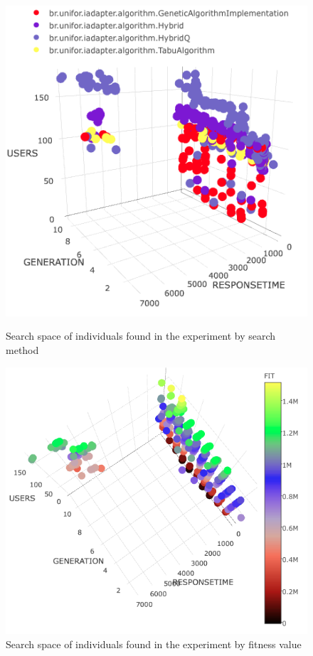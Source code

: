 \begin{figure}[h]
\begin{minipage}{.5\textwidth}
\centering
\includegraphics[width=1\textwidth]{./images/SearchSurface.png}
\caption{Search space of individuals found in the experiment by search method}
\label{fig:surface}
\end{minipage}
\begin{minipage}{.5\textwidth}
\centering
\includegraphics[width=1\textwidth]{./images/searchsurface2.png}
\caption{Search space of individuals found in the experiment by fitness value}
\label{fig:surface2}
\end{minipage}
\end{figure}

